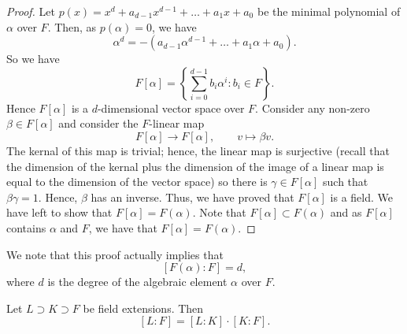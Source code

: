 \begin{proof}
	Let $p(x) = x^d + a_{d-1}x^{d-1} + \ldots + a_1x + a_0$ be the minimal 
	polynomial of $\alpha$ over $F$.
	Then, as $p(\alpha) = 0$, we have
	\[
		\alpha^d
		= -(a_{d-1} \alpha^{d-1} + \ldots + a_1 \alpha + a_0).
	\]
	So we have
	\[
		F[\alpha]
		= \left\{
			\sum_{i=0}^{d-1} b_i\alpha^i : b_i \in F
		\right\}.
	\]
	Hence $F[\alpha]$ is a $d$-dimensional vector space over $F$.
	Consider any non-zero $\beta \in F[\alpha]$
	and consider the $F$-linear map
	\[
		F[\alpha] \to F[\alpha], \qquad v \mapsto \beta v.
	\]
	The kernal of this map is trivial; hence,
	the linear map is surjective (recall that
	the dimension of the kernal plus the dimension of the image
	of a linear map is equal to the dimension of the vector space)
	so there is
	$\gamma \in F[\alpha]$ such that $\beta\gamma = 1$.
	Hence, $\beta$ has an inverse.
	Thus, we have proved that $F[\alpha]$ is a field.
	We have left to show that $F[\alpha] = F(\alpha)$.
	Note that $F[\alpha] \subset F(\alpha)$ and as
	$F[\alpha]$ contains $\alpha$ and $F$,
	we have that $F[\alpha] = F(\alpha)$.
\end{proof}

We note that this proof actually implies that
\[
	[F(\alpha): F] = d,
\]
where $d$ is the degree of the algebraic element $\alpha$
over $F$.

\begin{theorem}[]
	Let $L \supset K \supset F$ be field extensions.
	Then
	\[
		[L:F] = [L:K] \cdot [K:F].
	\]
\end{theorem}

